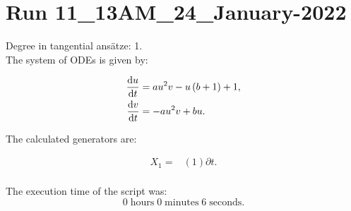 \section*{Run 11\_13AM\_24\_January-2022}
Degree in tangential ansätze:	1.\\
The system of ODEs is given by:

\begin{align*}
\dv{u}{t}&=a u^{2} v - u \left(b + 1\right) + 1,\\
\dv{v}{t}&=- a u^{2} v + b u.\\
\end{align*}

\noindent The calculated generators are:

\begin{align*}
X_{1}=&\left(1 \right)\partial t.\\
\end{align*}

\noindent The execution time of the script was:
$$0\;\mathrm{hours}\;0\;\mathrm{minutes}\;6 \;\mathrm{seconds}.$$
